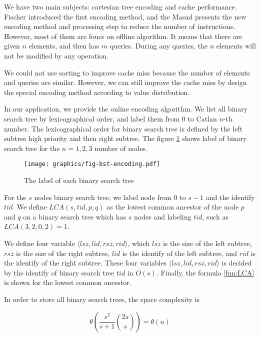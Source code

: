 We have two main subjects: cartesian tree encoding and cache
performance.   Fischer introduced the first encoding method, and the
Masud presents the new encoding method and processing step to reduce
the number of instructions. However, most of them are foucs on offline
algorithm. It means that there are given $n$ elements, and then has
$m$ queries. During any queries, the $n$ elements will not be modified
by any operation.

We could not use sorting to improve cache miss because the number of
elements and queries are similar. However, we can still improve the
cache miss by design the special encoding method according to value
distribution.

In our application, we provide the online encoding algorithm. We list
all binary search tree by lexicographical order, and label them from
$0$ to Catlan $n$-th number. The lexicographical order for binary
search tree is defined by the left subtree high priority and then
right subtree. The figure \ref{fig:labelingBST} shows label of binary
search tree for the $n=1,2,3$ number of nodes.

\begin{figure}[!thb]
  \centering
  \texttt{[image: graphics/fig-bst-encoding.pdf]}
  \caption{The label of each binary search tree}
  \label{fig:labelingBST}
\end{figure}

For the $s$ nodes binary search tree, we label node from $0$ to $s-1$
and the identify $\mathit{tid}$.  We define $\mathit{LCA}(s,
\mathit{tid}, p, q)$ as the lowest common ancestor of the node $p$ and
$q$ on a binary search tree which has $s$ nodes and labeling
$\mathit{tid}$, such as $\mathit{LCA}(3, 2, 0, 2) = 1$.

We define four variable
$\langle\mathit{lsz},\mathit{lid},\mathit{rsz},\mathit{rid}\rangle$,
which $\mathit{lsz}$ is the size of the left subtree, $\mathit{rsz}$
is the size of the right subtree, $\mathit{lid}$ is the identify of
the left subtree, and $\mathit{rid}$ is the identify of the right
subtree. These four variables
$\langle\mathit{lsz},\mathit{lid},\mathit{rsz},\mathit{rid}\rangle$ is
decided by the identify of binary search tree $\mathit{tid}$ in
$O(s)$. Finally, the formula \ref{fun:LCA} is shown for the lowest
common ancestor.

In order to store all binary search trees, the space complexity is 

\begin{equation}
\theta\left(\frac{s^2}{s+1} \binom{2s}{s}\right) = \theta\left(n\right)
\end{equation}

